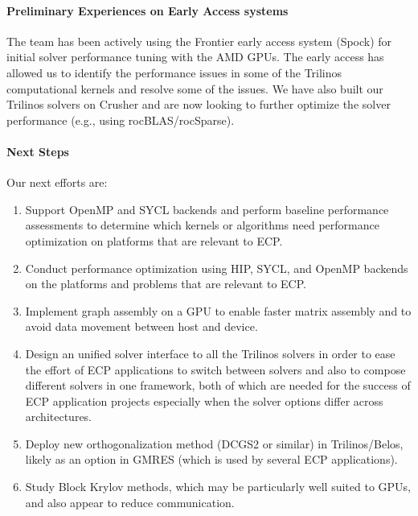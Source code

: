 \paragraph{Preliminary Experiences on Early Access systems}

The team has been actively using the Frontier early access system (Spock) for initial solver performance tuning with the AMD GPUs.
The early access has allowed us to identify the performance issues in some of the Trilinos computational kernels
and resolve some of the issues.
We have also built our Trilinos solvers on Crusher and are now looking to
further optimize the solver performance (e.g., using rocBLAS/rocSparse).


\paragraph{Next Steps}
Our next efforts are:
\begin{enumerate}
\item Support OpenMP and SYCL backends and
      perform baseline performance assessments to determine which kernels or algorithms need performance optimization
      on platforms that are relevant to ECP.
\item Conduct performance optimization using HIP, SYCL, and OpenMP backends on the platforms and problems
      that are relevant to ECP.
\item Implement graph assembly on a GPU to enable faster matrix assembly and to avoid data movement between host and device.
\item Design an unified solver interface to all the Trilinos solvers in order to ease the effort of ECP applications
      to switch between solvers and also to compose different solvers in one framework, both of which are needed for the success of ECP application projects especially when the solver options differ across architectures.
\item Deploy new orthogonalization method (DCGS2 or similar) in Trilinos/Belos, likely as an option in GMRES (which is used by several ECP applications).
\item Study Block Krylov methods, which may be particularly well suited to GPUs, and also appear to reduce communication.
\end{enumerate}

